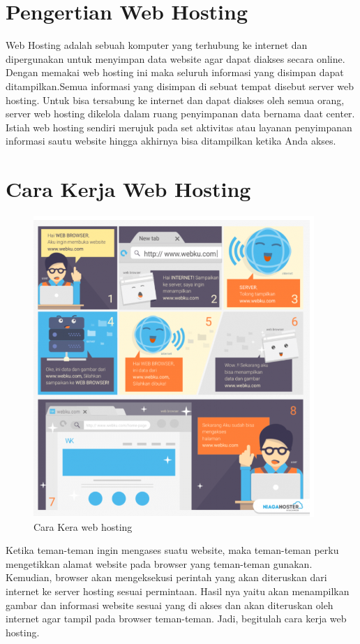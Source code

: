 \section{Pengertian Web Hosting}
\hfill \break
Web Hosting adalah sebuah komputer yang terhubung ke internet dan dipergunakan untuk menyimpan data website agar dapat diakses secara online. 
\hfill \break
Dengan memakai web hosting ini maka seluruh informasi yang disimpan dapat ditampilkan.Semua informasi yang disimpan di sebuat tempat disebut server web hosting. Untuk bisa tersabung ke internet dan dapat diakses oleh semua orang, server web hosting dikelola dalam ruang penyimpanan data bernama daat center.
\hfill \break
Istiah web hosting sendiri merujuk pada set aktivitas atau layanan penyimpanan informasi sautu website hingga akhirnya bisa ditampilkan ketika Anda akses. 

\section{Cara Kerja Web Hosting}
\hfill \break
\begin{figure}[!htbp]
  		 \centering
 		 \includegraphics[width=.75\textwidth]{figures/web.png}
  		 \caption{Cara Kera web hosting}\label{fig:done}
		 \end{figure}
\hfill \break
Ketika teman-teman ingin mengases suatu website, maka teman-teman perku mengetikkan alamat website pada browser yang teman-teman gunakan.
\hfill \break
Kemudian, browser akan mengeksekusi perintah yang akan diteruskan dari internet ke server hosting sesuai permintaan. Hasil nya yaitu akan menampilkan gambar dan informasi website sesuai yang di akses dan akan diteruskan oleh internet agar tampil pada browser teman-teman. Jadi, begitulah cara kerja web hosting.
